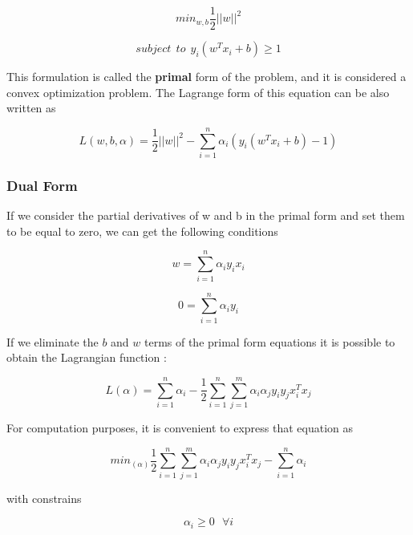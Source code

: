 \documentclass[11pt,twocolumn,letterpaper]{article}
\begin{document}
\begin{equation}
	min_{w,b} \frac{1}{2}||w||^2
\end{equation}

\begin{equation}
	subject \:\:to  \:\: y_i(w^T x_i + b) \geq 1
\end{equation}

This formulation is called the \textbf{primal} form of the problem, and it is considered a convex optimization problem. The Lagrange form of this equation can be also written as \cite{Bishop2006}

\begin{equation}
	L(w,b,\alpha) = \frac{1}{2}||w||^2 - \sum_{i=1}^{n} \alpha_i (y_i(w^T x_i + b) -1) 
\end{equation}

\subsubsection{Dual Form}

If we consider the partial derivatives of w and b in the primal form and set them to be equal to zero, we can get the following conditions

\begin{equation}
	w = \sum_{i=1}^{n} \alpha_i y_i x_i
\end{equation}

\begin{equation}
	0 = \sum_{i=1}^{n} \alpha_i y_i
\end{equation}

If we eliminate the $b$ and $w$ terms of the primal form equations it is possible to obtain the Lagrangian function \cite{Bishop2006}:

\begin{equation}
	L(\alpha) = \sum_{i=1}^{n} \alpha_i - \frac{1}{2} \sum_{i=1}^{n} \sum_{j=1}^{m} \alpha_i \alpha_j y_i y_j x_i^T x_j
\end{equation}

For computation purposes, it is convenient to express that equation as

\begin{equation}
	min_{(\alpha)} \frac{1}{2} \sum_{i=1}^{n} \sum_{j=1}^{m} \alpha_i \alpha_j y_i y_j x_i^T x_j - \sum_{i=1}^{n} \alpha_i
\end{equation}

with constrains

\begin{equation}
	\alpha_i \geq 0  \:\:\: \forall i
\end{equation}
\end{document}
